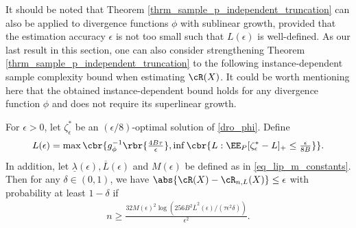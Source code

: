 \documentclass[9pt]{article} %
\numberwithin{equation}{section}
\renewcommand{\frac}[2]{\tfrac{#1}{#2}}
\begin{document}
It should be noted that Theorem \ref{thrm_sample_p_independent_truncation}  can also be applied to divergence functions $\phi$ with sublinear growth, provided that the estimation accuracy $\epsilon$ is not too small such that $L(\epsilon)$ is well-defined. 
As our last result in this section, one can also consider strengthening  Theorem \ref{thrm_sample_p_independent_truncation} to the following instance-dependent sample complexity bound when estimating $\cR(X)$. 
It could be worth mentioning here that the obtained instance-dependent bound holds for any divergence function $\phi$ and does not require its superlinear growth.

\begin{theorem}\label{thrm_instance_dependent}
 For $\epsilon > 0$, 
 let $\zeta^*_{\epsilon}$ be an $(\epsilon/8)$-optimal solution of \eqref{dro_phi}. 
 Define 
 \begin{align}\label{def_L_instance}
 L(\epsilon) =\max \cbr{g_\phi^{-1}\rbr{\frac{4 B\tau }{ \epsilon}},  \inf \cbr{L: \EE_P [\zeta^*_\epsilon - L]_+ \leq \frac{\epsilon}{8B}} }.
 \end{align}
In addition, let $\underline{\lambda} (\epsilon), \overline{L}(\epsilon)$ and $M(\epsilon)$ be defined as in \eqref{eq_lip_m_constants}.
 Then for any $\delta \in (0,1)$, we have $\abs{\cR(X) - \cR_{n,L}(X)} \leq \epsilon$ with probability at least $1-\delta$
 if 
 \begin{align*}
 n \geq 
 \frac{
 32 M(\epsilon)^2 \log(256 B^2 \overline{L}^2 (\epsilon)/ (\tau \epsilon^2 \delta)) 
 }{\epsilon^2}.
 \end{align*}
\end{theorem} 
\end{document}
